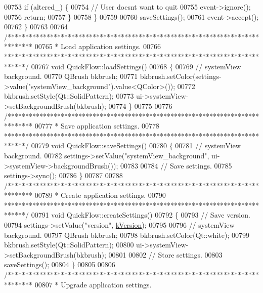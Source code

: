 \begin{DoxyCode}
00753     \textcolor{keywordflow}{if} (altered\_) \{
00754       \textcolor{comment}{// User doesnt want to quit}
00755       \textcolor{keyword}{event}->ignore();
00756       \textcolor{keywordflow}{return};
00757     \}
00758   \}
00759 
00760   saveSettings();
00761   \textcolor{keyword}{event}->accept();
00762 \}
00763 
00764 \textcolor{comment}{/*******************************************************************************}
00765 \textcolor{comment}{ * Load application settings.}
00766 \textcolor{comment}{ ******************************************************************************/}
00767 \textcolor{keywordtype}{void} QuickFlow::loadSettings()
00768 \{
00769   \textcolor{comment}{// systemView background.}
00770   QBrush bkbrush;
00771   bkbrush.setColor(settings->value(\textcolor{stringliteral}{"systemView\_background"}).value<QColor>());
00772   bkbrush.setStyle(Qt::SolidPattern);
00773   ui->systemView->setBackgroundBrush(bkbrush);
00774 \}
00775 
00776 \textcolor{comment}{/*******************************************************************************}
00777 \textcolor{comment}{ * Save application settings.}
00778 \textcolor{comment}{ ******************************************************************************/}
00779 \textcolor{keywordtype}{void} QuickFlow::saveSettings()
00780 \{
00781   \textcolor{comment}{// systemView background.}
00782   settings->setValue(\textcolor{stringliteral}{"systemView\_background"}, ui->systemView->backgroundBrush());
00783 
00784   \textcolor{comment}{// Save settings.}
00785   settings->sync();
00786 \}
00787 
00788 \textcolor{comment}{/*******************************************************************************}
00789 \textcolor{comment}{ * Create application settings.}
00790 \textcolor{comment}{ ******************************************************************************/}
00791 \textcolor{keywordtype}{void} QuickFlow::createSettings()
00792 \{
00793   \textcolor{comment}{// Save version.}
00794   settings->setValue(\textcolor{stringliteral}{"version"}, \hyperlink{group___window_gabfc3b1280bdae9a9c046d56b1459ab99}{kVersion});
00795 
00796 \textcolor{comment}{//  systemView background.}
00797   QBrush bkbrush;
00798   bkbrush.setColor(Qt::white);
00799   bkbrush.setStyle(Qt::SolidPattern);
00800   ui->systemView->setBackgroundBrush(bkbrush);
00801 
00802   \textcolor{comment}{// Store settings.}
00803   saveSettings();
00804 \}
00805 
00806 \textcolor{comment}{/*******************************************************************************}
00807 \textcolor{comment}{ * Upgrade application settings.}

\end{DoxyCode}

